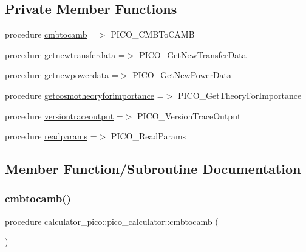 \subsection*{Private Member Functions}
\begin{DoxyCompactItemize}
\item 
procedure \mbox{\hyperlink{structcalculator__pico_1_1pico__calculator_a809f55d4bea6b70aee1ccd608f607254}{cmbtocamb}} =$>$ P\+I\+C\+O\+\_\+\+C\+M\+B\+To\+C\+A\+MB
\item 
procedure \mbox{\hyperlink{structcalculator__pico_1_1pico__calculator_a3e5f7852d9a3df80c1abc97860f61aa4}{getnewtransferdata}} =$>$ P\+I\+C\+O\+\_\+\+Get\+New\+Transfer\+Data
\item 
procedure \mbox{\hyperlink{structcalculator__pico_1_1pico__calculator_a7f646300ae355a3f3b408e35345f7261}{getnewpowerdata}} =$>$ P\+I\+C\+O\+\_\+\+Get\+New\+Power\+Data
\item 
procedure \mbox{\hyperlink{structcalculator__pico_1_1pico__calculator_a32509dc3989f21cec83703a5a9fdce66}{getcosmotheoryforimportance}} =$>$ P\+I\+C\+O\+\_\+\+Get\+Theory\+For\+Importance
\item 
procedure \mbox{\hyperlink{structcalculator__pico_1_1pico__calculator_aebf3c845a2233b617d46f39ac25c6ded}{versiontraceoutput}} =$>$ P\+I\+C\+O\+\_\+\+Version\+Trace\+Output
\item 
procedure \mbox{\hyperlink{structcalculator__pico_1_1pico__calculator_ae4497f9d07469e36c85ea5448e1da3a2}{readparams}} =$>$ P\+I\+C\+O\+\_\+\+Read\+Params
\end{DoxyCompactItemize}


\subsection{Member Function/\+Subroutine Documentation}
\mbox{\label{structcalculator__pico_1_1pico__calculator_a809f55d4bea6b70aee1ccd608f607254}} 
\subsubsection{\texorpdfstring{cmbtocamb()}{cmbtocamb()}}
{\footnotesize\ttfamily procedure calculator\+\_\+pico\+::pico\+\_\+calculator\+::cmbtocamb (\begin{DoxyParamCaption}{ }\end{DoxyParamCaption})\hspace{0.3cm}{\ttfamily [private]}}

